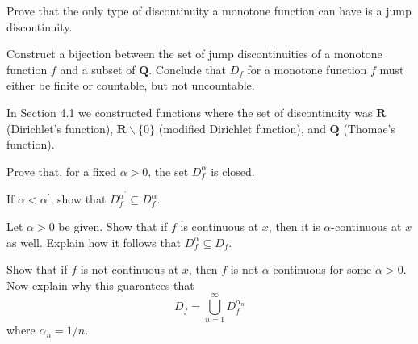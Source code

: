 \begin{exercise}
  Prove that the only type of discontinuity a monotone function can have is a jump discontinuity.
\end{exercise}
\begin{solution}
  \TODO
\end{solution}

\begin{exercise}
  Construct a bijection between the set of jump discontinuities of a monotone function $f$ and a subset of $\mathbf{Q}$. Conclude that $D_{f}$ for a monotone function $f$ must either be finite or countable, but not uncountable.
\end{exercise}
\begin{solution}
  \TODO
\end{solution}

\begin{exercise}
  In Section 4.1 we constructed functions where the set of discontinuity was $\mathbf{R}$ (Dirichlet's function), $\mathbf{R} \backslash\{0\}$ (modified Dirichlet function), and $\mathbf{Q}$ (Thomae's function).

\end{exercise}
\begin{solution}
  \TODO
\end{solution}

\begin{exercise}
  Prove that, for a fixed $\alpha>0$, the set $D_{f}^{\alpha}$ is closed.
\end{exercise}
\begin{solution}
  \TODO
\end{solution}

\begin{exercise}
  If $\alpha<\alpha^{\prime}$, show that $D_{f}^{\alpha^{\prime}} \subseteq D_{f}^{\alpha}$.
\end{exercise}
\begin{solution}
  \TODO
\end{solution}

\begin{exercise}
  Let $\alpha>0$ be given. Show that if $f$ is continuous at $x$, then it is $\alpha$-continuous at $x$ as well. Explain how it follows that $D_{f}^{\alpha} \subseteq D_{f}$.
\end{exercise}
\begin{solution}
  \TODO
\end{solution}

\begin{exercise}
  Show that if $f$ is not continuous at $x$, then $f$ is not $\alpha$-continuous for some $\alpha>0$. Now explain why this guarantees that
  $$
  D_{f}=\bigcup_{n=1}^{\infty} D_{f}^{\alpha_{n}}
  $$
  where $\alpha_{n}=1 / n$.
\end{exercise}
\begin{solution}
  \TODO
\end{solution}
